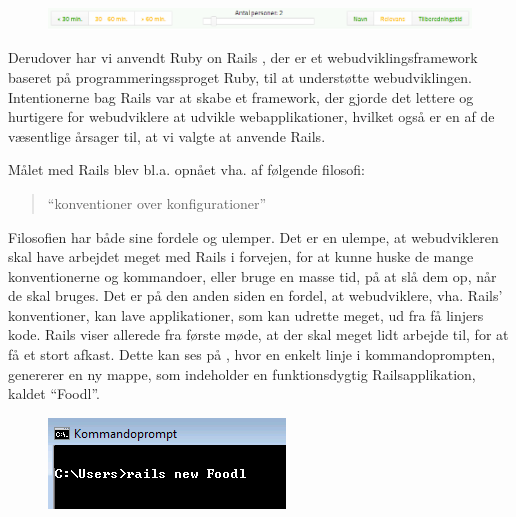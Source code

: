 \begin{figure}[H]
\centering
\includegraphics[scale=0.6]{billeder/jqueryuieksempel.png}
\label{fig:toolbar}
\end{figure}

Derudover har vi anvendt Ruby on Rails \cite{rubyonrailswiki}, der er et webudviklingsframework baseret på programmeringssproget Ruby, til at understøtte webudviklingen. Intentionerne bag Rails var at skabe et framework, der gjorde det lettere og hurtigere for webudviklere at udvikle webapplikationer, hvilket også er en af de væsentlige årsager til, at vi valgte at anvende Rails. 

Målet med Rails blev bl.a. opnået vha. af følgende filosofi:
\begin{quote}
``konventioner over konfigurationer''
\end{quote} 

Filosofien har både sine fordele og ulemper. Det er en ulempe, at webudvikleren skal have arbejdet meget med Rails i forvejen, for at kunne huske de mange konventionerne og kommandoer, eller bruge en masse tid, på at slå dem op, når de skal bruges. Det er på den anden siden en fordel, at webudviklere, vha. Rails' konventioner, kan lave applikationer, som kan udrette meget, ud fra få linjers kode. Rails viser allerede fra første møde, at der skal meget lidt arbejde til, for at få et stort afkast. Dette kan ses på , hvor en enkelt linje i kommandoprompten, genererer en ny mappe, som indeholder en funktionsdygtig Railsapplikation, kaldet ``Foodl''.

\begin{figure}
	\centering
	\includegraphics[scale=0.6]{billeder/Rails-new-foodl.png}
	\label{fig:Rails-new-foodl}
\end{figure}

